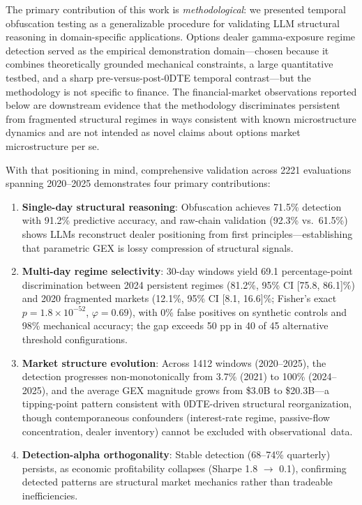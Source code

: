 \documentclass[jrfm,article,accept,moreauthors,pdftex]{Definitions/mdpi}
\begin{document}
The primary contribution of this work is \textit{methodological}: we
presented temporal obfuscation testing as a generalizable procedure
for validating LLM structural reasoning in domain-specific applications.
Options dealer gamma-exposure regime detection served as the empirical
demonstration domain---chosen because it combines theoretically
grounded mechanical constraints, a large quantitative testbed, and a
sharp pre-versus-post-0DTE temporal contrast---but the methodology is
not specific to finance. The financial-market observations reported
below are downstream evidence that the methodology discriminates
persistent from fragmented structural regimes in ways consistent with
known microstructure dynamics and are not intended as novel claims
about options market microstructure per se.

With that positioning in mind, comprehensive validation across 2221
evaluations spanning 2020--2025 demonstrates four primary contributions:

\begin{enumerate}
\item \textbf{Single-day structural reasoning}: Obfuscation achieves 71.5\% detection with 91.2\% predictive accuracy, and raw-chain validation (92.3\% vs.\ 61.5\%) shows LLMs reconstruct dealer positioning from first principles---establishing that parametric GEX is lossy compression of structural signals.

\item \textbf{Multi-day regime selectivity}: 30-day windows yield 69.1 percentage-point discrimination between 2024 persistent regimes (81.2\%, 95\% CI [75.8, 86.1]\%) and 2020 fragmented markets (12.1\%, 95\% CI [8.1, 16.6]\%; Fisher's exact $p = 1.8 \times 10^{-52}$, $\varphi = 0.69$), with 0\% false positives on synthetic controls and 98\% mechanical accuracy; the gap exceeds 50 pp in 40 of 45 alternative threshold configurations.

\item \textbf{Market structure evolution}: Across 1412 windows (2020--2025), the detection progresses non-monotonically from 3.7\% (2021) to 100\% (2024--2025), and the average GEX magnitude grows from \$3.0B to \$20.3B---a tipping-point pattern consistent with 0DTE-driven structural reorganization, though contemporaneous confounders (interest-rate regime, passive-flow concentration, dealer inventory) cannot be excluded with \mbox{observational data.}

\item \textbf{Detection-alpha orthogonality}: Stable detection (68--74\% quarterly) persists, as economic profitability collapses (Sharpe 1.8 $\rightarrow$ 0.1), confirming detected patterns are structural market mechanics rather than tradeable inefficiencies.
\end{enumerate}
\end{document}
